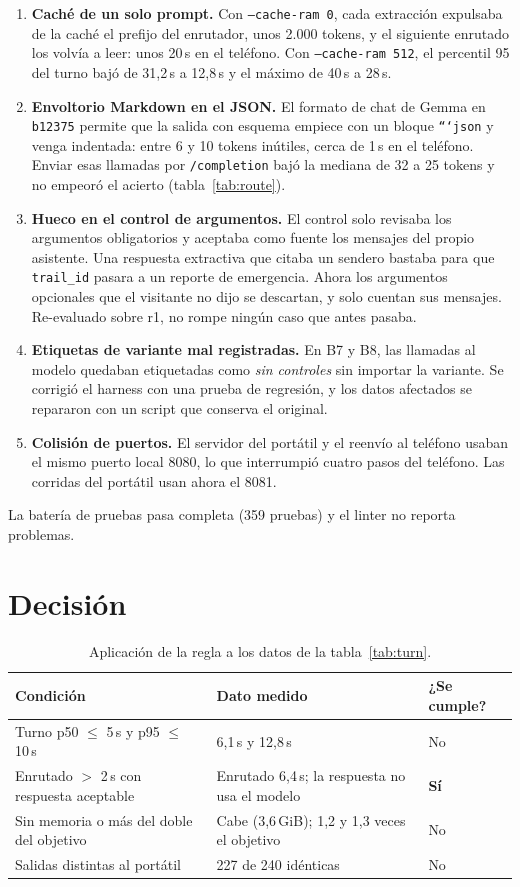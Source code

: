 \documentclass[11pt,a4paper]{article}
\newcommand{\m}[1]{\texttt{#1}}
\begin{document}
\begin{enumerate}
\item \textbf{Caché de un solo prompt.} Con \m{--cache-ram 0}, cada extracción expulsaba de la caché el prefijo del enrutador, unos 2.000 tokens, y el siguiente enrutado los volvía a leer: unos 20\,s en el teléfono. Con \m{--cache-ram 512}, el percentil 95 del turno bajó de 31,2\,s a 12,8\,s y el máximo de 40\,s a 28\,s.
\item \textbf{Envoltorio Markdown en el JSON.} El formato de chat de Gemma en \m{b12375} permite que la salida con esquema empiece con un bloque \m{```json} y venga indentada: entre 6 y 10 tokens inútiles, cerca de 1\,s en el teléfono. Enviar esas llamadas por \m{/completion} bajó la mediana de 32 a 25 tokens y no empeoró el acierto (tabla~\ref{tab:route}).
\item \textbf{Hueco en el control de argumentos.} El control solo revisaba los argumentos obligatorios y aceptaba como fuente los mensajes del propio asistente. Una respuesta extractiva que citaba un sendero bastaba para que \m{trail\_id} pasara a un reporte de emergencia. Ahora los argumentos opcionales que el visitante no dijo se descartan, y solo cuentan sus mensajes. Re-evaluado sobre r1, no rompe ningún caso que antes pasaba.
\item \textbf{Etiquetas de variante mal registradas.} En B7 y B8, las llamadas al modelo quedaban etiquetadas como \emph{sin controles} sin importar la variante. Se corrigió el harness con una prueba de regresión, y los datos afectados se repararon con un script que conserva el original.
\item \textbf{Colisión de puertos.} El servidor del portátil y el reenvío al teléfono usaban el mismo puerto local 8080, lo que interrumpió cuatro pasos del teléfono. Las corridas del portátil usan ahora el 8081.
\end{enumerate}

La batería de pruebas pasa completa (359 pruebas) y el linter no reporta problemas.

\section{Decisión}

\begin{table}[H]
\centering\small
\caption{Aplicación de la regla a los datos de la tabla~\ref{tab:turn}.}\label{tab:decision}
\begin{tabularx}{\textwidth}{@{}lLl@{}}
\toprule
Condición & Dato medido & ¿Se cumple?\\
\midrule
Turno p50 $\le$ 5\,s y p95 $\le$ 10\,s & 6,1\,s y 12,8\,s & No\\
Enrutado $>$ 2\,s con respuesta aceptable & Enrutado 6,4\,s; la respuesta no usa el modelo & \textbf{Sí}\\
Sin memoria o más del doble del objetivo & Cabe (3,6\,GiB); 1,2 y 1,3 veces el objetivo & No\\
Salidas distintas al portátil & 227 de 240 idénticas & No\\
\bottomrule
\end{tabularx}
\end{table}
\end{document}
